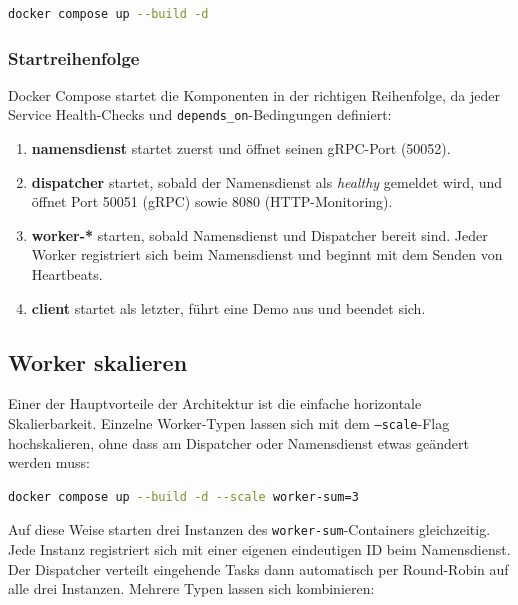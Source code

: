 \begin{lstlisting}[language=bash,caption={System im Hintergrund starten}]
docker compose up --build -d
\end{lstlisting}

\subsubsection*{Startreihenfolge}

Docker Compose startet die Komponenten in der richtigen Reihenfolge,
da jeder Service Health-Checks und \texttt{depends\_on}-Bedingungen definiert:

\begin{enumerate}
  \item \textbf{namensdienst} startet zuerst und öffnet seinen gRPC-Port (50052).
  \item \textbf{dispatcher} startet, sobald der Namensdienst als \textit{healthy}
        gemeldet wird, und öffnet Port 50051 (gRPC) sowie 8080 (HTTP-Monitoring).
  \item \textbf{worker-*} starten, sobald Namensdienst und Dispatcher bereit sind.
        Jeder Worker registriert sich beim Namensdienst und beginnt mit dem Senden
        von Heartbeats.
  \item \textbf{client} startet als letzter, führt eine Demo aus und beendet sich.
\end{enumerate}

\subsection{Worker skalieren}

Einer der Hauptvorteile der Architektur ist die einfache horizontale Skalierbarkeit.
Einzelne Worker-Typen lassen sich mit dem \texttt{--scale}-Flag hochskalieren,
ohne dass am Dispatcher oder Namensdienst etwas geändert werden muss:

\begin{lstlisting}[language=bash,caption={Mehrere Worker desselben Typs starten}]
docker compose up --build -d --scale worker-sum=3
\end{lstlisting}

Auf diese Weise starten drei Instanzen des \texttt{worker-sum}-Containers gleichzeitig.
Jede Instanz registriert sich mit einer eigenen eindeutigen ID beim Namensdienst.
Der Dispatcher verteilt eingehende Tasks dann automatisch per Round-Robin auf
alle drei Instanzen. Mehrere Typen lassen sich kombinieren:

